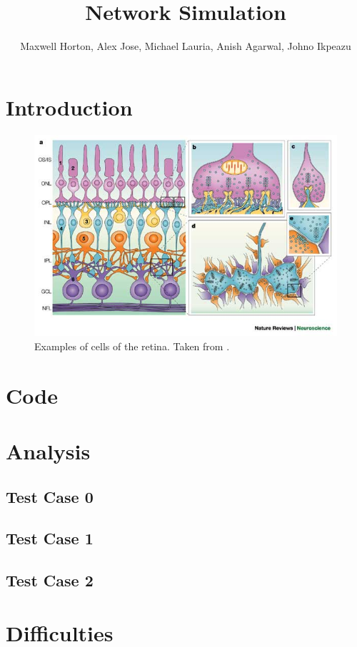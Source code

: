 \documentclass[12pt]{article}
\begin{document}
\title{Network Simulation}
\author{Maxwell Horton, Alex Jose, Michael Lauria, Anish Agarwal, Johno Ikpeazu}


\maketitle
\noindent
\tableofcontents
\newpage
\section{Introduction}

\begin{figure}[t]
\centering \includegraphics[scale=1.]{figures/cells_2.jpg}
\caption{Examples of cells of the retina. Taken from \cite{wassle}.}
\label{fig:test}
\end{figure}

\section{Code}
\section{Analysis}
\subsection{Test Case 0}
\subsection{Test Case 1}
\subsection{Test Case 2}
\section{Difficulties}
\end{document}
